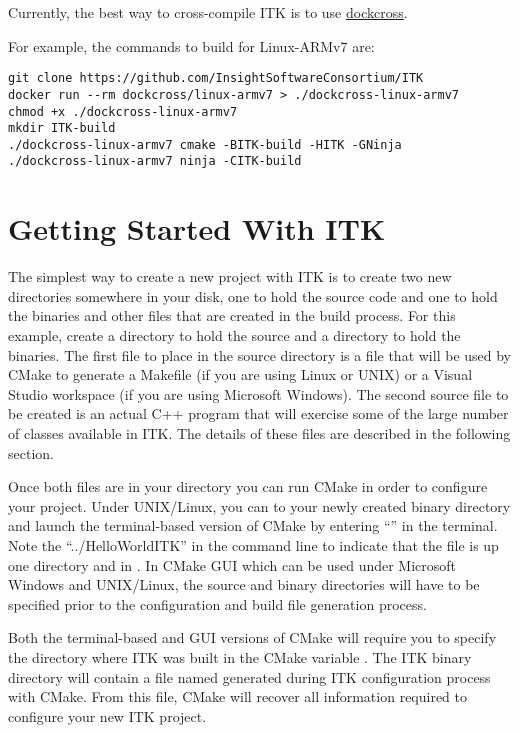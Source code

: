 Currently, the best way to cross-compile ITK is to use
\href{https://github.com/dockcross/dockcross}{dockcross}.

For example, the commands to build for Linux-ARMv7 are:

\small
\begin{verbatim}
git clone https://github.com/InsightSoftwareConsortium/ITK
docker run --rm dockcross/linux-armv7 > ./dockcross-linux-armv7
chmod +x ./dockcross-linux-armv7
mkdir ITK-build
./dockcross-linux-armv7 cmake -BITK-build -HITK -GNinja
./dockcross-linux-armv7 ninja -CITK-build
\end{verbatim}
\normalsize

\section{Getting Started With ITK}
\label{sec:GettingStartedWithITK}

The simplest way to create a new project with ITK is to create two new
directories somewhere in your disk, one to hold the source code and one to
hold the binaries and other files that are created in the build process. For
this example, create a  directory to hold the source and a
 directory to hold the binaries. The first file to
place in the source directory is a  file that will be
used by CMake to generate a Makefile (if you are using Linux or UNIX) or a
Visual Studio workspace (if you are using Microsoft Windows). The second source
file to be created is an actual C++ program that will exercise some of the large
number of classes available in ITK. The details of these files are described in
the following section.

Once both files are in your directory you can run CMake in order to configure
your project. Under UNIX/Linux, you can  to your newly created binary
directory and launch the terminal-based version of CMake by entering
``'' in the terminal. Note the
``../HelloWorldITK'' in the command line to indicate that the
 file is up one directory and in .
In CMake GUI which can be used under Microsoft Windows and UNIX/Linux, the
source and binary directories will have to be specified prior to the
configuration and build file generation process.

Both the terminal-based and GUI versions of CMake will require you to specify
the directory where ITK was built in the CMake variable . The ITK
binary directory will contain a file named  generated
during ITK configuration process with CMake. From this file, CMake will recover
all information required to configure your new ITK project.

